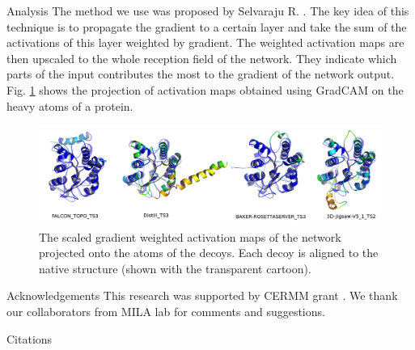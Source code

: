 \documentclass[final, unknownkeysallowed]{beamer}
\begin{document}
\begin{frame}{}
\begin{textblock}{39.0}
\begin{block}{Analysis}
The method we use was proposed 
by Selvaraju R. \cite{selvaraju2016grad}. The key idea of this technique is to propagate the gradient to a certain layer and take the sum of the 
activations of this layer weighted by gradient. The weighted activation maps are then upscaled to the whole reception field of the network.
They indicate which parts of the input contributes the most to the gradient of the network output. Fig. \ref{Fig:GradCAMT0776_more} shows 
the projection of activation maps obtained using GradCAM on the heavy atoms of a protein.

\begin{figure}[H]
    \centering
    \includegraphics[width=\linewidth]{../draft/Fig/T0776.png}
    \caption{The scaled gradient weighted activation maps of the network projected onto the atoms of the decoys. 
    Each decoy is aligned to the native structure (shown with the transparent cartoon).}
    \label{Fig:GradCAMT0776_more}
\end{figure}
\end{block}

\begin{block}{Acknowledgements}
This research was supported by CERMM grant .
We thank our collaborators from MILA lab for comments and suggestions.
\end{block}

\begin{block}{Citations}
{\small
{}}

\end{block}

\end{textblock}

\end{frame}
\end{document}
